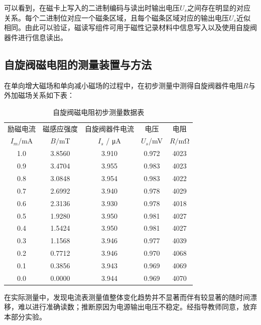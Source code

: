 \documentclass{thuemp}
\begin{document}
可以看到，在磁卡上写入的二进制编码与读出时输出电压$U_s$之间存在明显的对应关系。每个二进制位对应一个磁条区域，且每个磁条区域对应的输出电压$U_s$近似相同。由此可以验证，磁读写组件可用于磁性记录材料中信息写入以及使用自旋阀器件进行信息读出。

\subsection{自旋阀磁电阻的测量装置与方法}
在单向增大磁场和单向减小磁场的过程中，在初步测量中测得自旋阀器件电阻$R$与外加磁场关系如下表：
\begin{table}[H]
    \centering
    \captionnamefont{\wuhao\bf\heiti}
    \captiontitlefont{\wuhao\bf\heiti}
    \caption{自旋阀磁电阻初步测量数据表} \label{tab:spin_valve}
    \liuhao
    \begin{tabular}{ccccc}
        \toprule
        励磁电流& 磁感应强度 & 自旋阀器件电流 & 电压 & 电阻 \\
        $I_m$/\si{\milli\ampere} & $B/$\si{\milli\tesla} & $I_s$ / \si{\micro\ampere} & $U_s$/\si{\milli\volt} & $R/$\si{\milli\ohm} \\
        \midrule
        1.0 & 3.8560 & 3.910 & 0.972 & 4023 \\ 
        0.9 & 3.4704 & 3.955 & 0.983 & 4023 \\ 
        0.8 & 3.0848 & 3.954 & 0.983 & 4022 \\ 
        0.7 & 2.6992 & 3.940 & 0.978 & 4029 \\ 
        0.6 & 2.3136 & 3.930 & 0.978 & 4018 \\ 
        0.5 & 1.9280 & 3.950 & 0.981 & 4027 \\ 
        0.4 & 1.5424 & 3.950 & 0.981 & 4027 \\ 
        0.3 & 1.1568 & 3.946 & 0.977 & 4039 \\ 
        0.2 & 0.7712 & 3.946 & 0.970 & 4068 \\ 
        0.1 & 0.3856 & 3.943 & 0.969 & 4069 \\ 
        0.0 & 0.0000 & 3.944 & 0.969 & 4070 \\
        \bottomrule
    \end{tabular}
\end{table}

在实际测量中，发现电流表测量值整体变化趋势并不显著而伴有较显著的随时间漂移，难以进行准确读数；推断原因为电源输出电压不稳定。经指导教师同意，放弃本部分实验。
\end{document}
